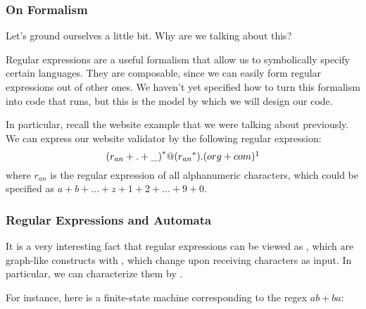 \documentclass[aspectratio=169]{beamer}
\begin{document}
\begin{frame}[fragile]
  \frametitle{On Formalism}

  Let's ground ourselves a little bit. Why are we talking about this?

  \pause
  \vspace{\fill}

  Regular expressions are a useful formalism that allow us to symbolically
  specify certain languages. They are composable, since we can easily form
  regular expressions out of other ones. We haven't yet
  specified how to turn this formalism into code that runs, but this is
  the model by which we will design our code.

  \pause
  \vspace{\fill}

  In particular, recall the website example that we were talking about
  previously. We can express our website validator by the following
  regular expression:
  $${(r_{an} + . + \_ )}^* @ ({r_{an}}^*) . (org + com)\footnotemark$$
  where $r_{an}$ is the regular expression of all alphanumeric 
  characters, which could be specified as $a + b + ... + z + 1 + 2 + ... + 9 + 0$.

\end{frame}


\begin{frame}[fragile]
  \frametitle{Regular Expressions and Automata}

  It is a very interesting fact that regular expressions can be viewed as
  , which are graph-like constructs with , 
  which change upon receiving characters as input. In particular, we can 
  characterize them by .\footnotemark

  \pause
  \vspace{\fill}

  For instance, here is a finite-state machine corresponding to the regex $ab + ba$:

  \pause
  \vspace{\fill}


\end{frame}
\end{document}

